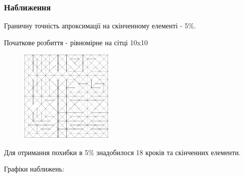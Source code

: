 \begin{frame}[allowframebreaks]
	\frametitle<presentation>{Наближення}

	Граничну точність апроксимації на скінченному елементі - 5\%.

	Початкове розбиття - рівномірне на сітці 10x10
	\begin{figure}[H]
		\centering
	    \includegraphics[width=0.4\textwidth]{problem1/InitialMesh}
	    \label{fig:init_mesh1}
	\end{figure}

	\framebreak

	Для отримання похибки в 5\% знадобилося 18 кроків та  скінченних елементи.

	Графіки наближень:


\end{frame}
